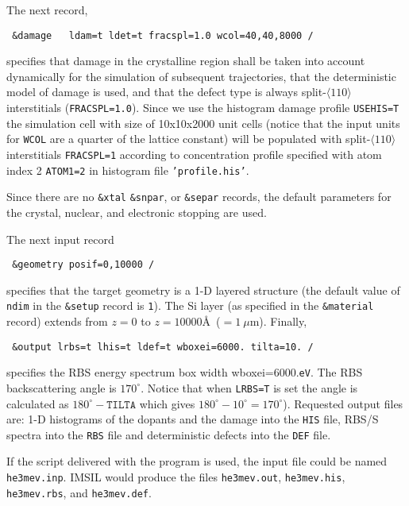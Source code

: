 The next record,
%
\begin{verbatim}
 &damage   ldam=t ldet=t fracspl=1.0 wcol=40,40,8000 /
\end{verbatim}
%
specifies that damage in the crystalline region shall be taken into account
dynamically for the simulation of subsequent trajectories, that the
deterministic model of damage is used, and that the defect type is always
split-$\langle 110 \rangle$ interstitials (\texttt{FRACSPL=1.0}). Since we use
the histogram damage profile \texttt{USEHIS=T} the simulation cell with size
of 10x10x2000 unit cells (notice that the input units for \texttt{WCOL} are a
quarter of the lattice constant) will be populated with
split-$\langle110\rangle$ interstitials \texttt{FRACSPL=1} according to
concentration profile specified with atom index 2 \texttt{ATOM1=2} in
histogram file \texttt{'profile.his'}.

Since there are no \texttt{\&xtal} \texttt{\&snpar}, or \texttt{\&separ}
records, the default parameters for the crystal, nuclear, and electronic
stopping are used.

The next input record
%
\begin{verbatim}
 &geometry posif=0,10000 /
\end{verbatim}
%
specifies that the target geometry is a 1-D layered structure (the default value
of \texttt{ndim} in the \texttt{\&setup} record is \texttt{1}). The Si layer (as
specified in the \texttt{\&material} record) extends from $z=0$ to
$z=10000$\AA\ ($=1~\mu$m). Finally,
%
\begin{verbatim}
 &output lrbs=t lhis=t ldef=t wboxei=6000. tilta=10. /
\end{verbatim}
%
specifies the RBS energy spectrum box width wboxei=6000.\texttt{eV}. The RBS
backscattering angle is $170^\circ$. Notice that when \texttt{LRBS=T} is set the
angle is calculated as $\texttt{$180^\circ$} - \texttt{TILTA}$ which gives
$180^\circ - 10^\circ = 170^\circ$). Requested output files are: 1-D
histograms of the dopants and the damage into the \texttt{HIS} file,
RBS/S spectra into the \texttt{RBS} file and deterministic defects into the
\texttt{DEF} file.

If the script delivered with the program is used, the input file could be
named \texttt{he3mev.inp}. IMSIL would produce the files \texttt{he3mev.out},
\texttt{he3mev.his}, \texttt{he3mev.rbs}, and \texttt{he3mev.def}.

